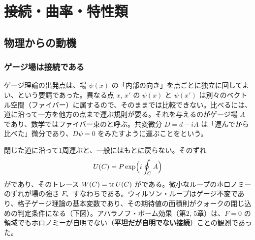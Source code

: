 \chapter{接続・曲率・特性類}\label{ch:08}

\section{物理からの動機}

\subsection*{ゲージ場は接続である}
ゲージ理論の出発点は、場 $\psi(x)$ の「内部の向き」を点ごとに独立に回してよい、という要請であった。異なる点 $x$, $x'$ の $\psi(x)$ と $\psi(x')$ は別々のベクトル空間（ファイバー）に属するので、そのままでは比較できない。比べるには、道に沿って一方を他方の点まで運ぶ規則が要る。それを与えるのがゲージ場 $A$ であり、数学ではファイバー束のと呼ぶ。共変微分 $D=d-iA$ は「運んでから比べた」微分であり、$D\psi=0$ をみたすように運ぶことをという。

閉じた道に沿って1周運ぶと、一般にはもとに戻らない。そのずれ
\[
U(C)=P\exp\Bigl(i\oint_CA\Bigr)
\]
がであり、そのトレース $W(C)=\tr U(C)$ がである。微小なループのホロノミーのずれが場の強さ $F$、すなわちである。ウィルソン・ループはゲージ不変であり、格子ゲージ理論の基本変数であり、その期待値の面積則がクォークの閉じ込めの判定条件になる（下図）。アハラノフ・ボーム効果（第2, 5章）は、$F=0$ の領域でもホロノミーが自明でない（\textbf{平坦だが自明でない接続}）ことの観測であった。

